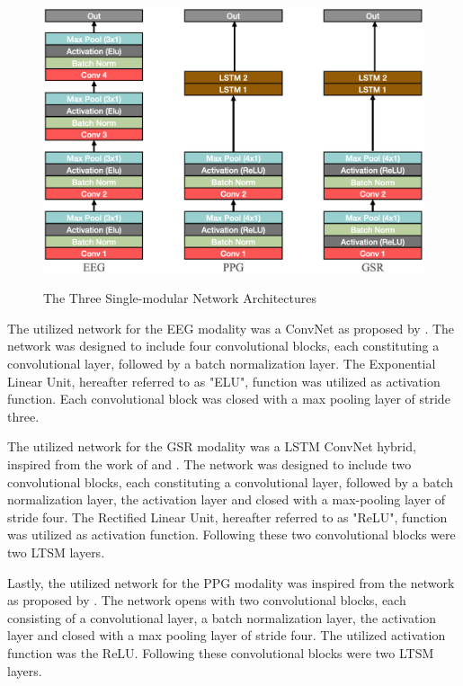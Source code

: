 \documentclass[12pt]{article}
\begin{document}
\begin{figure}
\caption{The Three Single-modular Network Architectures}
\bigskip
\includegraphics[scale=0.725]{single_model_architecture}
\label{fig:singlearchitecture}
\end{figure}

The utilized network for the EEG modality was a ConvNet as proposed by . The network was designed to include four convolutional blocks, each constituting a convolutional layer, followed by a batch normalization layer. The Exponential Linear Unit, hereafter referred to as "ELU", function was utilized as activation function. Each convolutional block was closed with a max pooling layer of stride three.

The utilized network for the GSR modality was a LSTM ConvNet hybrid, inspired from the work of  and . The network was designed to include two convolutional blocks, each constituting a convolutional layer, followed by a batch normalization layer, the activation layer and closed with a max-pooling layer of stride four. The Rectified Linear Unit, hereafter referred to as "ReLU", function was utilized as activation function. Following these two convolutional blocks were two LTSM layers.

Lastly, the utilized network for the PPG modality was inspired from the network as proposed by . The network opens with two convolutional blocks, each consisting of a convolutional layer, a batch normalization layer, the activation layer and closed with a max pooling layer of stride four. The utilized activation function was the ReLU. Following these convolutional blocks were two LTSM layers.
\end{document}
